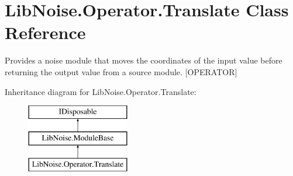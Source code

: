 \hypertarget{class_lib_noise_1_1_operator_1_1_translate}{}\section{Lib\+Noise.\+Operator.\+Translate Class Reference}
\label{class_lib_noise_1_1_operator_1_1_translate}


Provides a noise module that moves the coordinates of the input value before returning the output value from a source module. \mbox{[}O\+P\+E\+R\+A\+T\+OR\mbox{]}  


Inheritance diagram for Lib\+Noise.\+Operator.\+Translate\+:\begin{figure}[H]
\begin{center}
\leavevmode
\includegraphics[height=3.000000cm]{class_lib_noise_1_1_operator_1_1_translate}
\end{center}
\end{figure}
